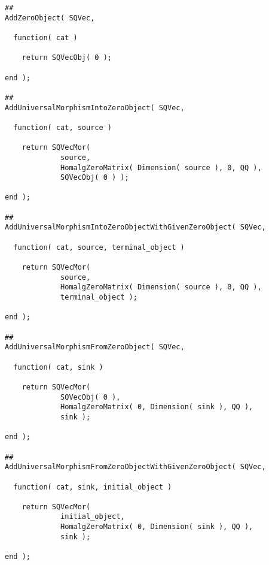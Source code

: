 \begin{small}
\begin{Verbatim}[frame=single]
##
AddZeroObject( SQVec,

  function( cat )

    return SQVecObj( 0 );

end );

##
AddUniversalMorphismIntoZeroObject( SQVec,

  function( cat, source )

    return SQVecMor(
             source,
             HomalgZeroMatrix( Dimension( source ), 0, QQ ),
             SQVecObj( 0 ) );
    
end );

##
AddUniversalMorphismIntoZeroObjectWithGivenZeroObject( SQVec,

  function( cat, source, terminal_object )

    return SQVecMor(
             source,
             HomalgZeroMatrix( Dimension( source ), 0, QQ ),
             terminal_object );
    
end );

##
AddUniversalMorphismFromZeroObject( SQVec,

  function( cat, sink )
    
    return SQVecMor(
             SQVecObj( 0 ),
             HomalgZeroMatrix( 0, Dimension( sink ), QQ ),
             sink );
    
end );

##
AddUniversalMorphismFromZeroObjectWithGivenZeroObject( SQVec,

  function( cat, sink, initial_object )
    
    return SQVecMor(
             initial_object,
             HomalgZeroMatrix( 0, Dimension( sink ), QQ ),
             sink );
    
end );
\end{Verbatim}
\end{small}